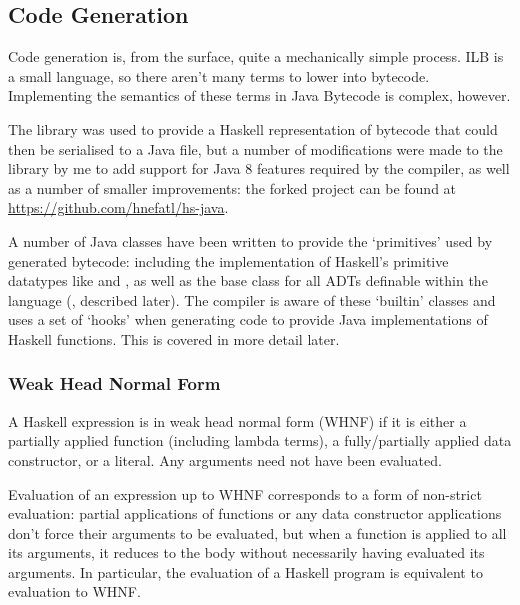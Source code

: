 \documentclass[dissertation.tex]{subfiles}
\begin{document}
{{{\begin{itemize}
{            }
            \end{itemize}

        }
    }
    \subsection{Code Generation}
    {
        
        Code generation is, from the surface, quite a mechanically simple process. ILB is a small language, so there
        aren't many terms to lower into bytecode. Implementing the semantics of these terms in Java Bytecode is complex,
        however.

        The  library was used to provide a Haskell representation of bytecode that could then be
        serialised to a Java  file, but a number of modifications were made to the library by me to
        add support for Java 8 features required by the compiler, as well as a number of smaller improvements: the
        forked project can be found at \url{https://github.com/hnefatl/hs-java}.

        A number of Java classes have been written to provide the `primitives' used by generated bytecode: including the
        implementation of Haskell's primitive datatypes like  and , as well as the base class
        for all ADTs definable within the language (, described later). The compiler is aware of
        these `builtin' classes and uses a set of `hooks' when generating code to provide Java implementations of
        Haskell functions. This is covered in more detail later.


        \subsubsection{Weak Head Normal Form}
        {

            A Haskell expression is in weak head normal form (WHNF) if it is either a partially applied function
            (including lambda terms), a fully/partially applied data constructor, or a literal. Any arguments need not
            have been evaluated.
            
            Evaluation of an expression up to WHNF corresponds to a form of non-strict evaluation: partial applications
            of functions or any data constructor applications don't force their arguments to be evaluated, but when a
            function is applied to all its arguments, it reduces to the body without necessarily having evaluated its
            arguments. In particular, the evaluation of a Haskell program is equivalent to evaluation to WHNF.

}}}
\end{document}
